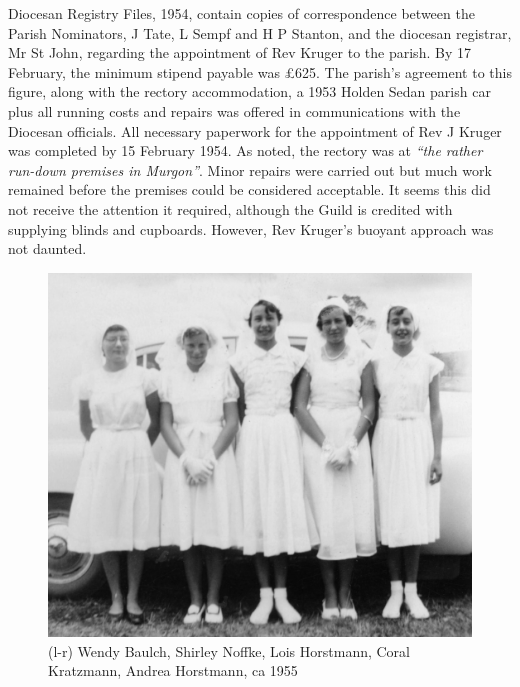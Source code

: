 Diocesan Registry Files, 1954, contain copies of correspondence between the Parish Nominators, J Tate, L Sempf and H P Stanton, and the diocesan registrar, Mr St John, regarding the appointment of Rev Kruger to the parish. By 17 February, the minimum stipend payable was \pounds625. The parish's agreement to this figure, along with the rectory accommodation, a 1953 Holden Sedan parish car plus all running costs and repairs was offered in communications with the Diocesan officials. All necessary paperwork for the appointment of Rev J Kruger was completed by 15 February 1954. As noted, the rectory was at \emph{``the rather run-down premises in Murgon''}. Minor repairs were carried out but much work remained before the premises could be considered acceptable. It seems this did not receive the attention it required, although the Guild is credited with supplying blinds and cupboards. However, Rev Kruger's buoyant approach was not daunted.









\begin{figure}[!htb]
\begin{center}
\includegraphics[width=1.\textwidth,center]{../images/confirmation1955.jpg}
\caption{(l-r) Wendy Baulch, Shirley Noffke, Lois Horstmann, Coral Kratzmann, Andrea Horstmann, ca 1955}
\end{center}
\end{figure}




